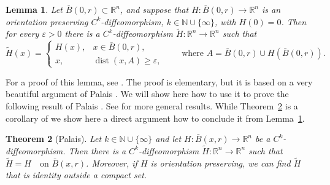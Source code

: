 \documentclass[12pt,leqno]{amsart}
\newtheorem{theorem}{Theorem}
\newtheorem{lemma}[theorem]{Lemma}
\theoremstyle{definition}
\newcommand{\bbbn}{\mathbb N}
\numberwithin{theorem}{section} \numberwithin{equation}{section}
\begin{document}
\begin{lemma}
\label{Pal1}
Let $\bar{B}(0,r)\subset \mathbb R^n$, and suppose that
$H:\bar{B}(0,r)\to \mathbb R^n$ is an orientation preserving
$C^k$-diffeomorphism, $k\in\bbbn\cup\{\infty\}$, with $H(0)=0$. Then for every $\varepsilon>0$ there
is a $C^k$-diffeomorphism $\widetilde H:\mathbb R^n\to\mathbb R^n$ such that
\[
\widetilde H(x)=
\begin{cases}
H(x), & x\in \bar{B}(0,r),\\
x, & \operatorname{dist}(x,A)\geq \varepsilon,
\end{cases}
\qquad
\text{where }
A=\bar{B}(0,r)\cup H(\bar{B}(0,r)).
\]
\end{lemma}
For a proof of this lemma, see \cite[Lemma~2.2]{GGH}. The proof is elementary, but it is based on a very beautiful argument of Palais \cite{palais}.
We will show here how to use it to prove the following result of Palais \cite{palais}. See \cite{GGH} for more general results. While Theorem~\ref{Pal2} is a corollary of \cite[Theorem~1.4]{GGH} we show here a direct argument how to conclude it from Lemma~\ref{Pal1}.
\begin{theorem}[Palais]
\label{Pal2}
Let $k\in\bbbn\cup\{\infty\}$ and let $H:\bar{B}(x,r)\to \mathbb R^n$ be a $C^k$-diffeomorphism. Then there is a $C^k$-diffeomorphism $\widetilde H:\mathbb R^n\to\mathbb R^n$ such that
$\widetilde H=H \quad \text{on } \bar{B}(x,r)$.
Moreover, if $H$ is orientation preserving, we can find $\widetilde H$ that is identity outside a compact set.
\end{theorem}
\end{document}
